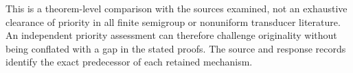 This is a theorem-level comparison with the sources examined, not an
exhaustive clearance of priority in all finite semigroup or nonuniform
transducer literature. An independent priority assessment can therefore
challenge originality without being conflated with a gap in the stated
proofs. The source and response records identify the exact predecessor
of each retained mechanism.
